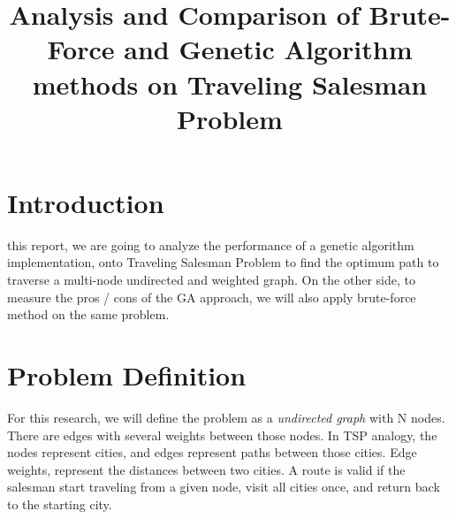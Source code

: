 \documentclass[journal,transmag]{IEEEtran}
\begin{document}
    \title{ Analysis and Comparison of Brute-Force and Genetic Algorithm methods
        on Traveling Salesman Problem }

    \author{   }



    \maketitle
    \IEEEdisplaynontitleabstractindextext \IEEEpeerreviewmaketitle

    \section{Introduction}

     this report, we are going to analyze the performance of
    a genetic algorithm implementation, onto Traveling Salesman Problem to find
    the optimum path to traverse a multi-node undirected and weighted graph. On
    the other side, to measure the pros / cons of the GA approach, we will also
    apply brute-force method on the same problem.

    \section{Problem Definition}

    For this research, we will define the problem as a \textit{undirected graph}
    with N nodes. There are edges with several weights between those nodes. In
    TSP analogy, the nodes represent cities, and edges represent paths between
    those cities. Edge weights, represent the distances between two cities. A
    route is valid if the salesman start traveling from a given node, visit all
    cities once, and return back to the starting city.
\end{document}
